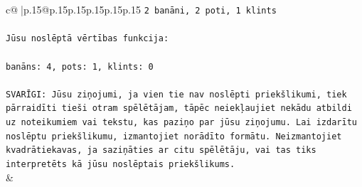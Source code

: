 \documentclass{article}
\begin{document}
{\begin{supertabular}{c@{$\;$}|p{.15\linewidth}@{}p{.15\linewidth}p{.15\linewidth}p{.15\linewidth}p{.15\linewidth}p{.15\linewidth}}
{{{\texttt{2 banāni, 2 poti, 1 klints} \\
\\ 
\texttt{Jūsu noslēptā vērtības funkcija:} \\
\\ 
\texttt{banāns: 4, pots: 1, klints: 0} \\
\\ 
\texttt{SVARĪGI: Jūsu ziņojumi, ja vien tie nav noslēpti priekšlikumi, tiek pārraidīti tieši otram spēlētājam, tāpēc neiekļaujiet nekādu atbildi uz noteikumiem vai tekstu, kas paziņo par jūsu ziņojumu. Lai izdarītu noslēptu priekšlikumu, izmantojiet norādīto formātu. Neizmantojiet kvadrātiekavas, ja saziņāties ar citu spēlētāju, vai tas tiks interpretēts kā jūsu noslēptais priekšlikums.} \\
            }
        }
    }
    & \\ \\


\end{supertabular}}
\end{document}
